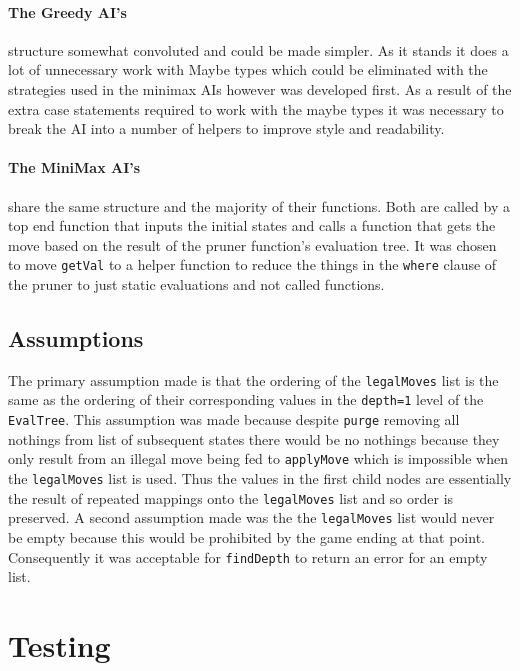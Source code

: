 \documentclass[11pt]{article}
\begin{document}
\paragraph{The Greedy AI's} structure somewhat convoluted and could be made simpler. As it stands it does a lot of unnecessary work with Maybe types which could be eliminated with the strategies used in the minimax AIs however was developed first. As a result of the extra case statements required to work with the maybe types it was necessary to break the AI into a number of helpers to improve style and readability.

\paragraph{The MiniMax AI's} share the same structure and the majority of their functions. Both are called by a top end function that inputs the initial states and calls a function that gets the move based on the result of the pruner function's evaluation tree. It was chosen to move \verb|getVal| to a helper function to reduce the things in the \verb|where| clause of the pruner to just static evaluations and not called functions.

 \subsection{Assumptions}%
The primary assumption made is that the ordering of the \verb|legalMoves| list is the same as the ordering of their corresponding values in the \verb|depth=1| level of the \verb|EvalTree|. This assumption was made because despite \verb|purge| removing all nothings from list of subsequent states there would be no nothings because they only result from an illegal move being fed to \verb|applyMove| which is impossible when the \verb|legalMoves| list is used. Thus the values in the first child nodes are essentially the result of repeated mappings onto the \verb|legalMoves| list and so order is preserved. A second assumption made was the the \verb|legalMoves| list would never be empty because this would be prohibited by the game ending at that point. Consequently it was acceptable for \verb|findDepth| to return an error for an empty list.

\newpage
\section{Testing}%
\end{document}
